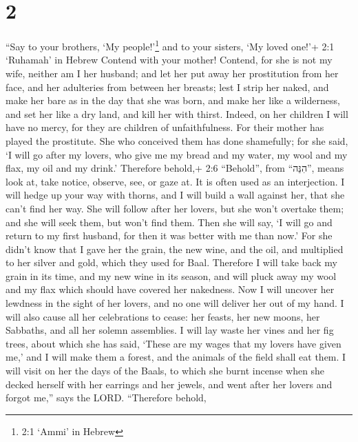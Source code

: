 \hypertarget{section-1}{%
\section{2}\label{section-1}}

 ``Say to your brothers, `My people!'\footnote{2:1 `Ammi' in
  Hebrew} and to your sisters, `My loved one!'+ 2:1 `Ruhamah' in Hebrew
 Contend with your mother! Contend, for she is not my wife,
neither am I her husband; and let her put away her prostitution from her
face, and her adulteries from between her breasts;  lest I
strip her naked, and make her bare as in the day that she was born, and
make her like a wilderness, and set her like a dry land, and kill her
with thirst.  Indeed, on her children I will have no mercy,
for they are children of unfaithfulness.  For their mother
has played the prostitute. She who conceived them has done shamefully;
for she said, `I will go after my lovers, who give me my bread and my
water, my wool and my flax, my oil and my drink.'  Therefore
behold,+ 2:6 ``Behold'', from ``הִנֵּה'', means look at, take notice,
observe, see, or gaze at. It is often used as an interjection. I will
hedge up your way with thorns, and I will build a wall against her, that
she can't find her way.  She will follow after her lovers,
but she won't overtake them; and she will seek them, but won't find
them. Then she will say, `I will go and return to my first husband, for
then it was better with me than now.'  For she didn't know
that I gave her the grain, the new wine, and the oil, and multiplied to
her silver and gold, which they used for Baal.  Therefore I
will take back my grain in its time, and my new wine in its season, and
will pluck away my wool and my flax which should have covered her
nakedness.  Now I will uncover her lewdness in the sight of
her lovers, and no one will deliver her out of my hand.  I
will also cause all her celebrations to cease: her feasts, her new
moons, her Sabbaths, and all her solemn assemblies.  I will
lay waste her vines and her fig trees, about which she has said, `These
are my wages that my lovers have given me,' and I will make them a
forest, and the animals of the field shall eat them.  I
will visit on her the days of the Baals, to which she burnt incense when
she decked herself with her earrings and her jewels, and went after her
lovers and forgot me,'' says the LORD.  ``Therefore behold,
